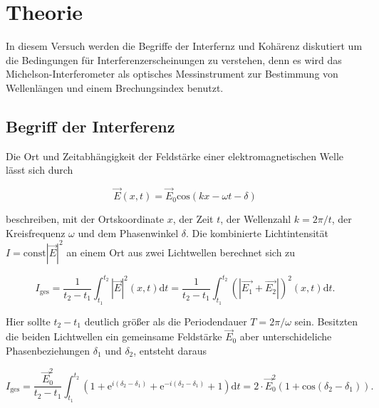 \section{Theorie}

    \noindent In diesem Versuch werden die Begriffe der Interfernz und Kohärenz diskutiert um die Bedingungen für 
    Interferenzerscheinungen zu verstehen, denn es wird das Michelson-Interferometer als optisches Messinstrument zur Bestimmung von 
    Wellenlängen und einem Brechungsindex benutzt.

    \subsection{Begriff der Interferenz}

        \noindent Die Ort und Zeitabhängigkeit der Feldstärke einer elektromagnetischen Welle lässt sich durch 

        \begin{equation}
            \vec{E}(x,t) = \vec{E}_0 \text{cos}(kx - \omega t - \delta) \nonumber
        \end{equation}

        \noindent beschreiben, mit der Ortskoordinate $x$, der Zeit $t$, der Wellenzahl $k = 2\pi/t$, der Kreisfrequenz $\omega$ und dem 
        Phasenwinkel $\delta$. Die kombinierte Lichtintensität $I = \text{const} |\vec{E}|^2$ an einem Ort aus zwei Lichtwellen berechnet sich 
        zu 

        \begin{equation}
            I_{\text{ges}} = \frac{1}{t_2 -t_1} \int_{t_1}^{t_2} |\vec{E}|^2(x,t) \text{d} t = 
            \frac{1}{t_2 -t_1} \int_{t_1}^{t_2} \left( |\vec{E_1} + \vec{E_2}| \right) ^2(x,t) \text{d} t  . \nonumber
        \end{equation}

        \noindent Hier sollte $t_2 - t_1$ deutlich größer als die Periodendauer $T=2\pi/\omega$ sein.
        Besitzten die beiden Lichtwellen ein gemeinsame Feldstärke $\vec{E}_0$ aber unterschideliche Phasenbeziehungen $\delta_1$ und $\delta_2$,
        entsteht daraus 

        \begin{equation}
            I_{\text{ges}} = \frac{\vec{E}_0^2}{t_2 - t_1} \int_{t_1}^{t_2} \left( 1 + \text{e}^{i(\delta_2 -\delta_1)} +\text{e}^{-i(\delta_2 -\delta_1)}
            +1 \right) \text{d} t = 2 \cdot \vec{E}_0^2 ( 1+ \text{cos}(\delta_2 - \delta_1)) . \nonumber
        \end{equation}

